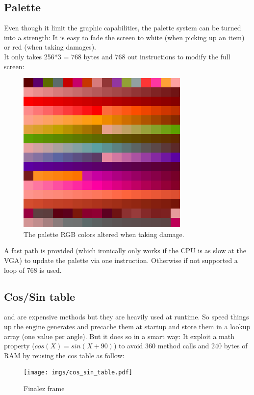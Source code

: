 \subsection{Palette}
Even though it limit the graphic capabilities, the palette system can be turned into a strength: It is easy to fade the screen to white (when picking up an item) or red (when taking damages).\\
It only takes 256*3 = 768 bytes and 768 out instructions to modify the full screen:
\begin{figure}[H]
  \centering
 \includegraphics[width=\textwidth]{imgs/palette_damage.png}
 \caption{The palette RGB colors altered when taking damage.} \label{fig:palette_damage}
\end{figure}
A fast path is provided (which ironically only works if the CPU is as slow at the VGA) to update the palette via one  instruction. Otherwise if not supported a loop of 768  is used.
\begin{minipage}{\linewidth}

\end{minipage}








\subsection{Cos/Sin table}
 and  are expensive methods but they are heavily used at runtime. So speed things up the engine generates and precache them at startup and store them in a lookup array (one value per angle). But it does so in a smart way: It exploit a math property ($cos(X) = sin(X + 90)$) to avoid 360  method calls and 240 bytes of RAM by reusing the cos table as follow:\\
\par

\begin{minipage}{\textwidth}

\end{minipage}


\begin{figure}[H]
 \centering
  \texttt{[image: imgs/cos\_sin\_table.pdf]}
 \caption{Finalez frame} 
\end{figure}

